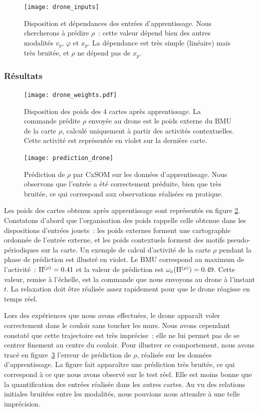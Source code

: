 \documentclass[../main]{subfiles}
\begin{document}
\begin{figure}
	\centering\texttt{[image: drone\_inputs]}
	\caption{Disposition et dépendances des entrées d'apprentissage. Nous chercherons à prédire $\rho$~: cette valeur dépend bien des autres modalités $v_y$, $\varphi$ et $x_p$. La dépendance est très simple (linéaire) mais très bruitée, et $\rho$ ne dépend pas de $x_p$. \label{fig:drone_inp}}
\end{figure}

\subsubsection{Résultats}
\begin{figure}
	\texttt{[image: drone\_weights.pdf]}
	\caption{Disposition des poids des 4 cartes après apprentissage. La commande prédite $\rho$ envoyée au drone est le poids externe du BMU de la carte $\rho$, calculé uniquement à partir des activités contextuelles. Cette activité est représentée en violet sur la dernière carte.}
	\label{fig:drone_w}
	\end{figure}

	\begin{figure}
		\centering\texttt{[image: prediction\_drone]}
		\caption{Prédiction de $\rho$ par CxSOM sur les données d'apprentissage. Nous observons que l'entrée a été correctement préduite, bien que très bruitée, ce qui correspond aux observations réalisées en pratique. \label{fig:pred_drone}}
	\end{figure}

Les poids des cartes obtenus après apprentissage sont représentés en figure \ref{fig:drone_w}. 
Constatons d'abord que l'organisation des poids rappelle celle obtenue dans les dispositions d'entrées jouets~: les poids externes forment une cartographie ordonnée de l'entrée externe, et les poids contextuels forment des motifs pseudo-périodiques sur la carte. 
Un exemple de calcul d'activité de la carte $\rho$ pendant la phase de prédiction est illustré en violet. Le BMU correspond au maximum de l'activité~: $\Pi^{({\rho})} = 0.41$ et la valeur de prédiction est $\omega_e(\Pi^{({\rho})}) = 0.49$. Cette valeur, remise à l'échelle, est la commande que nous envoyons au drone à l'instant $t$.
La relaxation doit être réalisée assez rapidement pour que le drone réagisse en temps réel.

Lors des expériences que nous avons effectuées, le drone apparaît voler correctement dans le couloir sans toucher les murs. Nous avons cependant constaté que cette trajectoire est très imprécise~: elle ne lui permet pas de se centrer finement au centre du couloir. Pour illustrer ce comportement, nous avons tracé en figure~\ref{fig:pred_drone} l'erreur de prédiction de $\rho$, réalisée sur les données d'apprentissage. La figure fait apparaître une prédiction très bruitée, ce qui correspond à ce que nous avons observé sur le test réel. Elle est moins bonne que la quantification des entrées réalisée dans les autres cartes. 
Au vu des relations initiales bruitées entre les modalités, nous pouvions nous attendre à une telle imprécision.
\end{document}
